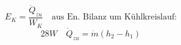 

\item[d)] \[
    E_K = \frac{\dot{Q}_{zu}}{W_K} \quad \text{aus En. Bilanz um Kühlkreislauf:}
    \]
    \[
    28W \quad \dot{Q}_{zu} = \dot{m} (h_2 - h_1)
    \]